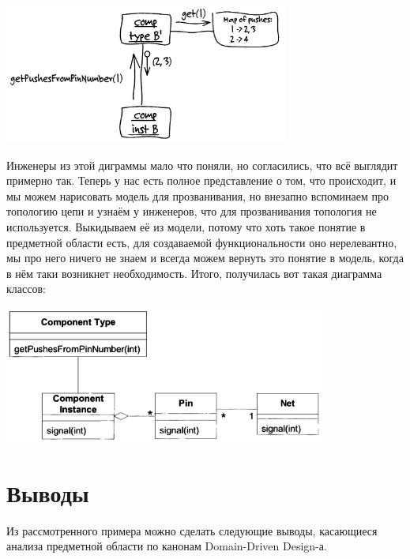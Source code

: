 \documentclass[a5paper]{article}
\begin{document}
\begin{center}
	\includegraphics[width=0.7\textwidth]{types.png}
\end{center}

Инженеры из этой диграммы мало что поняли, но согласились, что всё выглядит примерно так. Теперь у нас есть полное представление о том, что происходит, и мы можем нарисовать модель для прозванивания, но внезапно вспоминаем про топологию цепи и узнаём у инженеров, что для прозванивания топология не используется. Выкидываем её из модели, потому что хоть такое понятие в предметной области есть, для создаваемой функциональности оно нерелевантно, мы про него ничего не знаем и всегда можем вернуть это понятие в модель, когда в нём таки возникнет необходимость. Итого, получилась вот такая диаграмма классов:

\begin{center}
	\includegraphics[width=0.8\textwidth]{finalModel.png}
\end{center}

\section{Выводы}

Из рассмотренного примера можно сделать следующие выводы, касающиеся анализа предметной области по канонам Domain-Driven Design-а.
\end{document}

